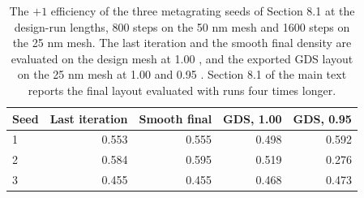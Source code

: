 \begin{table}[tbp]
\centering
\small
\renewcommand{\arraystretch}{1.15}
\caption{The $+1$ efficiency of the three metagrating seeds of Section 8.1 at the design-run lengths, 800 steps on the 50 nm mesh and 1600 steps on the 25 nm mesh. The last iteration and the smooth final density are evaluated on the design mesh at 1.00 \micron{}, and the exported GDS layout on the 25 nm mesh at 1.00 and 0.95 \micron{}. Section 8.1 of the main text reports the final layout evaluated with runs four times longer.}
\label{tab:si-metagrating-seeds}
\begin{tabular}{@{}lrrrr@{}}
\toprule
Seed & Last iteration & Smooth final & GDS, 1.00 \micron{} & GDS, 0.95 \micron{} \\
\midrule
1 & 0.553 & 0.555 & 0.498 & 0.592 \\
2 & 0.584 & 0.595 & 0.519 & 0.276 \\
3 & 0.455 & 0.455 & 0.468 & 0.473 \\
\bottomrule
\end{tabular}
\end{table}
